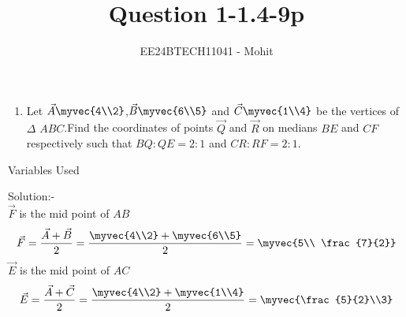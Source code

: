 \documentclass[journal]{IEEEtran}
\numberwithin{equation}{enumi}
\numberwithin{figure}{enumi}
\begin{document}

\title{Question 1-1.4-9p}
\author{EE24BTECH11041 - Mohit}
{\let\newpage\relax\maketitle}
\begin{enumerate}
	\item Let $\vec{A}\myvec{4\\2}$,$\vec{B}\myvec{6\\5}$ and $\vec{C}\myvec{1\\4}$ be the vertices of $\Delta$ $ABC$.Find the coordinates of points $\vec{Q}$ and $\vec{R}$ on medians $BE$ and $CF$ respectively such that $BQ:QE=2:1$ and $CR:RF=2:1$.
\end{enumerate}
\begin{table}[h!]    
  \centering
  
  \caption{Variables Used}
  \label{tab 1.4.9.2}
\end{table}
Solution:-\\
$\vec{F}$ is the mid point of $AB$\\
\begin{align}
	\vec{F}=\frac{\vec{A}+\vec{B}}{2}=\frac{\myvec{4\\2} + \myvec{6\\5}}{2}
=\myvec{5\\ \frac{7}{2}}
\end{align}
$\vec{E}$ is the mid point of $AC$\\
\begin{align}
	\vec{E}=\frac{\vec{A}+\vec{C}}{2}=\frac{\myvec{4\\2} + \myvec{1\\4}}{2}
=\myvec{\frac{5}{2}\\3}
\end{align}
\end{document}
